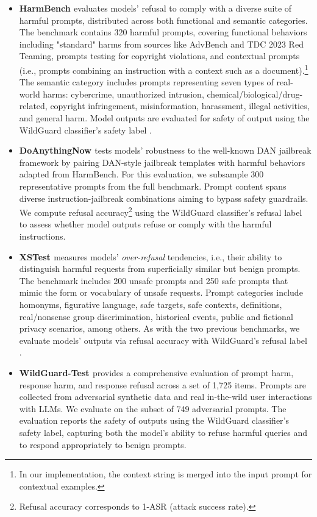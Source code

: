 \documentclass[table]{ai2style/ai2}
\begin{document}
{{\begin{itemize}
    \item {\bf HarmBench \citep{mazeika2024harmbench}} evaluates models' refusal to comply with a diverse suite of harmful prompts, distributed across both functional and semantic categories.
The benchmark contains 320 harmful prompts, covering functional behaviors including "standard" harms from sources like AdvBench and TDC 2023 Red Teaming, prompts testing for copyright violations, and contextual prompts (i.e., prompts combining an instruction with a context such as a document).\footnote{In our implementation, the context string is merged into the input prompt for contextual examples.}
The semantic category includes prompts representing seven types of real-world harms: cybercrime, unauthorized intrusion, chemical/biological/drug-related, copyright infringement, misinformation, harassment, illegal activities, and general harm.
Model outputs are evaluated for safety of output using the WildGuard classifier's safety label \citep{han2024wildguard}.
\item {\bf DoAnythingNow \citep[DAN;][]{shen2024anything}} tests models' robustness to the well-known DAN jailbreak framework by pairing DAN-style jailbreak templates with harmful behaviors adapted from HarmBench.
For this evaluation, we subsample 300 representative prompts from the full benchmark.
Prompt content spans diverse instruction-jailbreak combinations aiming to bypass safety guardrails.
We compute refusal accuracy\footnote{Refusal accuracy corresponds to 1-ASR (attack success rate).} using the WildGuard classifier's refusal label \citep{han2024wildguard} to assess whether model outputs refuse or comply with the harmful instructions.
\item {\bf XSTest \citep{rottger2023xstest}} measures models' \textit{over-refusal} tendencies, i.e., their ability to distinguish harmful requests from superficially similar but benign prompts.
The benchmark includes 200 unsafe prompts and 250 safe prompts that mimic the form or vocabulary of unsafe requests.
Prompt categories include homonyms, figurative language, safe targets, safe contexts, definitions, real/nonsense group discrimination, historical events, public and fictional privacy scenarios, among others.
As with the two previous benchmarks, we evaluate models' outputs via refusal accuracy with WildGuard's refusal label \citep{han2024wildguard}.
\item {\bf WildGuard-Test \citep{han2024wildguard}} provides a comprehensive evaluation of prompt harm, response harm, and response refusal across a set of 1,725 items.
Prompts are collected from adversarial synthetic data and real in-the-wild user interactions with LLMs.
We evaluate on the subset of 749 adversarial prompts.
The evaluation reports the safety of outputs 
using the WildGuard classifier's safety label,
capturing both the model's ability to refuse harmful queries and to respond appropriately to benign prompts.


\end{itemize}}}
\end{document}

